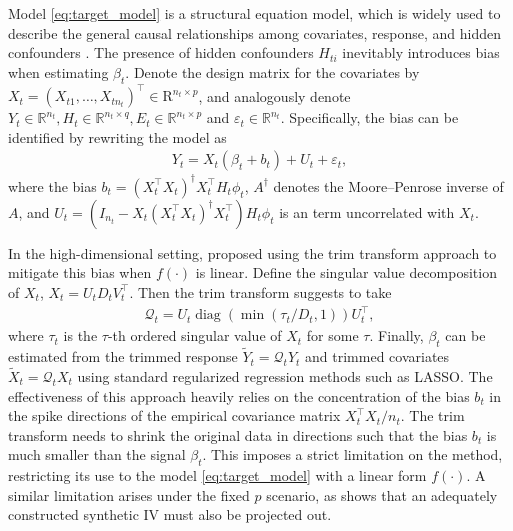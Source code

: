 \documentclass[12pt]{article}
\begin{document}
Model \eqref{eq:target_model} is a structural equation model, which is widely used to describe the general causal relationships among covariates, response, and hidden confounders \citep{fox2002structural,pearl2012causal}. The presence of hidden confounders $H_{ti}$ inevitably introduces bias when estimating $\beta_t$. Denote the design matrix for the covariates by $X_t=(X_{t1},\ldots,X_{tn_t})^\top\in\mathrm{R}^{n_t\times p}$, and analogously denote $Y_t\in \mathbb{R}^{n_t}, H_t\in \mathbb{R}^{n_t\times q},E_t\in \mathbb{R}^{n_t\times p}$ and $\varepsilon_t\in \mathbb{R}^{n_t}$.
Specifically, the bias can be identified by rewriting the model as 
\begin{align}
    Y_{t} =  X_{t}(\beta_t+b_t) + U_{t}+\varepsilon_{t},
    \label{perturb}
\end{align}
where the bias $b_t =(X_t^\top X_t)^{\dagger}X_t^\top H_t \phi_t$, $A^{\dagger}$ denotes the Moore–Penrose inverse of $A$, and $U_{t} = (I_{n_t} - X_t (X_t^\top X_t)^{\dagger}X_t^\top) H_t\phi_t$ is an term uncorrelated with $X_t$.

In the high-dimensional setting, \cite{cevid2020spectral,guo2022doubly,sun2024decorrelating} proposed using the trim transform approach to mitigate this bias when $f(\cdot)$ is linear. Define the singular value decomposition of $X_t$, $X_t = U_tD_tV^\top_t$. Then the trim transform suggests to take
\begin{align}
\label{eq:trim_transform}
    \mathcal{Q}_t = U_t \operatorname{diag}\left(\min(\tau_t/D_t,1)\right)U_t^\top,
\end{align}
where $\tau_t$ is the $\tau$-th ordered singular value of $X_t$ for some $\tau$. Finally, $\beta_t$ can be estimated from the trimmed response $\tilde{Y}_t = \mathcal{Q}_t Y_t$ and trimmed covariates $\tilde{X}_t=\mathcal{Q}_t X_t$ using standard regularized regression methods such as LASSO.
The effectiveness of this approach heavily relies on the concentration of the bias $b_t$ in the spike directions of the empirical covariance matrix $X_t^\top X_t/n_t$. The trim transform needs to shrink the original data in directions such that the bias $b_t$ is much smaller than the signal $\beta_t$. This imposes a strict limitation on the method, restricting its use to the model \eqref{eq:target_model} with a linear form $f(\cdot)$. A similar limitation arises under the fixed $p$ scenario, as \cite{tang2023synthetic} shows that an adequately constructed synthetic IV must also be projected out.
\end{document}
